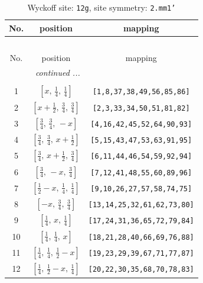 \documentclass[fleqn,8pt]{jsarticle}
\begin{document}
\begin{longtable}{ccc}
\caption{Wyckoff site: {\tt 12g}, site symmetry: {\tt 2.mm1'}}
 \\
 \hline \hline
No. & position & mapping \\ \hline \endfirsthead

\multicolumn{2}{l}{\tablename\ \thetable{}} \\
 \hline \hline
No. & position & mapping \\ \hline \endhead

 \hline \hline
\multicolumn{2}{r}{\footnotesize\it continued ...} \\ \endfoot

 \hline \hline
\multicolumn{2}{r}{} \\ \endlastfoot

1 & $\left[ x,\, \frac{1}{4},\, \frac{1}{4} \right]$ & {\tt [1,8,37,38,49,56,85,86]} \\ \hline
2 & $\left[ x + \frac{1}{2},\, \frac{3}{4},\, \frac{3}{4} \right]$ & {\tt [2,3,33,34,50,51,81,82]} \\ \hline
3 & $\left[ \frac{3}{4},\, \frac{3}{4},\, - x \right]$ & {\tt [4,16,42,45,52,64,90,93]} \\ \hline
4 & $\left[ \frac{3}{4},\, \frac{3}{4},\, x + \frac{1}{2} \right]$ & {\tt [5,15,43,47,53,63,91,95]} \\ \hline
5 & $\left[ \frac{3}{4},\, x + \frac{1}{2},\, \frac{3}{4} \right]$ & {\tt [6,11,44,46,54,59,92,94]} \\ \hline
6 & $\left[ \frac{3}{4},\, - x,\, \frac{3}{4} \right]$ & {\tt [7,12,41,48,55,60,89,96]} \\ \hline
7 & $\left[ \frac{1}{2} - x,\, \frac{1}{4},\, \frac{1}{4} \right]$ & {\tt [9,10,26,27,57,58,74,75]} \\ \hline
8 & $\left[ - x,\, \frac{3}{4},\, \frac{3}{4} \right]$ & {\tt [13,14,25,32,61,62,73,80]} \\ \hline
9 & $\left[ \frac{1}{4},\, x,\, \frac{1}{4} \right]$ & {\tt [17,24,31,36,65,72,79,84]} \\ \hline
10 & $\left[ \frac{1}{4},\, \frac{1}{4},\, x \right]$ & {\tt [18,21,28,40,66,69,76,88]} \\ \hline
11 & $\left[ \frac{1}{4},\, \frac{1}{4},\, \frac{1}{2} - x \right]$ & {\tt [19,23,29,39,67,71,77,87]} \\ \hline
12 & $\left[ \frac{1}{4},\, \frac{1}{2} - x,\, \frac{1}{4} \right]$ & {\tt [20,22,30,35,68,70,78,83]} \\
\end{longtable}
\end{document}
